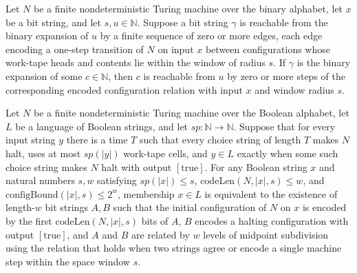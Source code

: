 \begin{theorem}
\label{Complexity.TQBFHard.reflTransGen_stepRel}
\leanok
{}
Let $N$ be a finite nondeterministic Turing machine over the binary alphabet, let $x$ be
a bit string, and let $s,u\in\mathbb N$. Suppose a bit string $\gamma$ is reachable from
the binary expansion of $u$ by a finite sequence of zero or more edges, each edge
encoding a one-step transition of $N$ on input $x$ between configurations whose
work-tape heads and contents lie within the window of radius $s$. If $\gamma$ is the
binary expansion of some $c\in\mathbb N$, then $c$ is reachable from $u$ by zero or more
steps of the corresponding encoded configuration relation with input $x$ and window
radius $s$.
\end{theorem}

\begin{theorem}
\label{Complexity.TQBFHard.mem_iff_mid}
\leanok
{}
Let $N$ be a finite nondeterministic Turing machine over the Boolean alphabet, let $L$
be a language of Boolean strings, and let $sp:\mathbb{N}\to\mathbb{N}$. Suppose that for
every input string $y$ there is a time $T$ such that every choice string of length $T$
makes $N$ halt, uses at most $sp(|y|)$ work-tape cells, and $y\in L$ exactly when some
such choice string makes $N$ halt with output $[\mathrm{true}]$. For any Boolean string
$x$ and natural numbers $s,w$ satisfying $sp(|x|)\le s$, $\mathrm{codeLen}(N,|x|,s)\le
w$, and $\mathrm{configBound}(|x|,s)\le 2^w$, membership $x\in L$ is equivalent to the
existence of length-$w$ bit strings $A,B$ such that the initial configuration of $N$ on
$x$ is encoded by the first $\mathrm{codeLen}(N,|x|,s)$ bits of $A$, $B$ encodes a
halting configuration with output $[\mathrm{true}]$, and $A$ and $B$ are related by $w$
levels of midpoint subdivision using the relation that holds when two strings agree or
encode a single machine step within the space window $s$.
\end{theorem}
